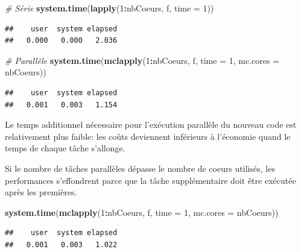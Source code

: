 \documentclass[
  12pt,
  french,
  a4paper,
  extrafontsizes,onecolumn,openright
  ]{memoir}
\newenvironment{Shaded}{\begin{snugshade}}{\end{snugshade}}
\newcommand{\CommentTok}[1]{\textcolor[rgb]{0.56,0.35,0.01}{\textit{#1}}}
\newcommand{\DataTypeTok}[1]{\textcolor[rgb]{0.13,0.29,0.53}{#1}}
\newcommand{\DecValTok}[1]{\textcolor[rgb]{0.00,0.00,0.81}{#1}}
\newcommand{\KeywordTok}[1]{\textcolor[rgb]{0.13,0.29,0.53}{\textbf{#1}}}
\newcommand{\NormalTok}[1]{#1}
\newcommand{\OperatorTok}[1]{\textcolor[rgb]{0.81,0.36,0.00}{\textbf{#1}}}
\newlength{\rf}
\begin{document}
\scriptsize

\begin{Shaded}
\begin{Highlighting}[]
\CommentTok{# Série}
\KeywordTok{system.time}\NormalTok{(}\KeywordTok{lapply}\NormalTok{(}\DecValTok{1}\OperatorTok{:}\NormalTok{nbCoeurs, f, }\DataTypeTok{time =} \DecValTok{1}\NormalTok{))}
\end{Highlighting}
\end{Shaded}

\begin{verbatim}
##    user  system elapsed 
##   0.000   0.000   2.036
\end{verbatim}

\begin{Shaded}
\begin{Highlighting}[]
\CommentTok{# Parallèle}
\KeywordTok{system.time}\NormalTok{(}\KeywordTok{mclapply}\NormalTok{(}\DecValTok{1}\OperatorTok{:}\NormalTok{nbCoeurs, f, }\DataTypeTok{time =} \DecValTok{1}\NormalTok{, }\DataTypeTok{mc.cores =}\NormalTok{ nbCoeurs))}
\end{Highlighting}
\end{Shaded}

\begin{verbatim}
##    user  system elapsed 
##   0.001   0.003   1.154
\end{verbatim}

\normalsize

Le temps additionnel nécessaire pour l'exécution parallèle du nouveau code est relativement plus faible: les coûts deviennent inférieurs à l'économie quand le temps de chaque tâche s'allonge.

Si le nombre de tâches parallèles dépasse le nombre de coeurs utilisés, les performances s'effondrent parce que la tâche supplémentaire doit être exécutée après les premières.

\scriptsize

\begin{Shaded}
\begin{Highlighting}[]
\KeywordTok{system.time}\NormalTok{(}\KeywordTok{mclapply}\NormalTok{(}\DecValTok{1}\OperatorTok{:}\NormalTok{nbCoeurs, f, }\DataTypeTok{time =} \DecValTok{1}\NormalTok{, }\DataTypeTok{mc.cores =}\NormalTok{ nbCoeurs))}
\end{Highlighting}
\end{Shaded}

\begin{verbatim}
##    user  system elapsed 
##   0.001   0.003   1.022
\end{verbatim}
\end{document}
